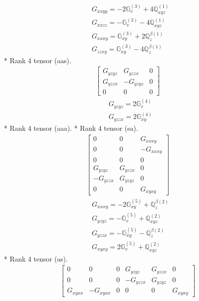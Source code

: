 \documentclass[fleqn,8pt,landscape]{jsarticle}
\begin{document}
\begin{align*}
& G_{xxyy} = - 2 \mathbb{G}_{v}^{(3)} + 4 \mathbb{Q}_{xyz}^{(1)} \\
& G_{xxzz} = - \mathbb{G}_{v}^{(3)} - 4 \mathbb{Q}_{xyz}^{(1)} \\
& G_{xxxy} = \mathbb{G}_{xy}^{(3)} + 2 \mathbb{Q}_{z}^{\beta(1)} \\
& G_{zzxy} = \mathbb{G}_{xy}^{(3)} - 4 \mathbb{Q}_{z}^{\beta(1)}
\end{align*}
* Rank 4 tensor (aas).
\begin{align*}
\begin{bmatrix} G_{yzyz} & G_{yzzx} & 0 \\ G_{yzzx} & - G_{yzyz} & 0 \\ 0 & 0 & 0 \end{bmatrix}
\end{align*}
\begin{align*}
& G_{yzyz} = 2 \mathbb{G}_{v}^{(4)} \\
& G_{yzzx} = 2 \mathbb{G}_{xy}^{(4)}
\end{align*}
* Rank 4 tensor (aaa).
* Rank 4 tensor (sa).
\begin{align*}
\begin{bmatrix} 0 & 0 & G_{xxxy} \\ 0 & 0 & - G_{xxxy} \\ 0 & 0 & 0 \\ G_{yzyz} & G_{yzzx} & 0 \\ - G_{yzzx} & G_{yzyz} & 0 \\ 0 & 0 & G_{xyxy} \end{bmatrix}
\end{align*}
\begin{align*}
& G_{xxxy} = - 2 \mathbb{G}_{xy}^{(5)} + \mathbb{Q}_{z}^{\beta(2)} \\
& G_{yzyz} = - \mathbb{G}_{v}^{(5)} + \mathbb{Q}_{xyz}^{(2)} \\
& G_{yzzx} = - \mathbb{G}_{xy}^{(5)} - \mathbb{Q}_{z}^{\beta(2)} \\
& G_{xyxy} = 2 \mathbb{G}_{v}^{(5)} + \mathbb{Q}_{xyz}^{(2)}
\end{align*}
* Rank 4 tensor (as).
\begin{align*}
\begin{bmatrix} 0 & 0 & 0 & G_{yzyz} & G_{yzzx} & 0 \\ 0 & 0 & 0 & - G_{yzzx} & G_{yzyz} & 0 \\ G_{xyxx} & - G_{xyxx} & 0 & 0 & 0 & G_{xyxy} \end{bmatrix}
\end{align*}
\end{document}
